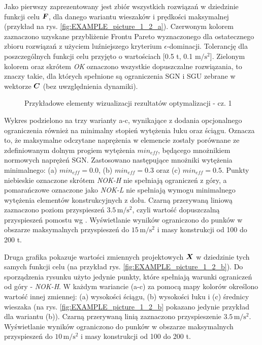 Jako pierwszy zaprezentowany jest zbiór wszystkich rozwiązań w dziedzinie funkcji celu $\bm{F}$, dla danego wariantu wieszaków i prędkości maksymalnej (przykład na rys. \ref{fig:EXAMPLE_picture_1_2_a}). Czerwonym kolorem zaznaczono uzyskane przybliżenie Frontu Pareto wyznaczonego dla ostatecznego zbioru rozwiązań z użyciem luźniejszego kryterium $\epsilon$-dominacji. Tolerancję dla poszczególnych funkcji celu przyjęto o wartościach [0.5 t, 0.1 $\mathrm{m/s^2}$]. Zielonym kolorem oraz skrótem \textit{OK} oznaczono wszystkie dopuszczalne rozwiązania, to znaczy takie, dla których spełnione są ograniczenia SGN i SGU zebrane w wektorze $\bm{C}$ (bez uwzględnienia dynamiki).  
\begin{figure}[b!]
	\centering
	\captionsetup{justification=centering}
	\caption{Przykładowe elementy wizualizacji rezultatów optymalizacji - cz. 1}
	\label{fig:EXAMPLE_picture_1_2}
\end{figure}
Wykres podzielono na trzy warianty a-c, wynikające z dodania opcjonalnego ograniczenia również na minimalny stopień wytężenia łuku oraz ściągu. Oznacza to, że maksymalne odczytane naprężenia w elemencie zostały porównane ze zdefiniowanym dolnym progiem wytężenia $min_{eff}$, będącego mnożnikiem normowych naprężeń SGN. Zastosowano następujące mnożniki wytężenia minimalnego: (a) $min_{eff}=0.0$, (b) $min_{eff}=0.3$ oraz (c) $min_{eff}=0.5$. Punkty niebieskie oznaczone skrótem \textit{NOK-H} nie spełniają ograniczeń z góry, a pomarańczowe oznaczone jako \textit{NOK-L} nie spełniają wymogu minimalnego wytężenia elementów konstrukcyjnych z dołu. Czarną przerywaną liniową zaznaczono poziom przyspieszeń $3.5\,\mathrm{m/s^2}$, czyli wartość dopuszczalną przyspieszeń pomostu wg \cite{PKNc}. Wyświetlanie wyników ograniczono do punków w obszarze maksymalnych przyspieszeń do  $15\,\mathrm{m/s^2}$ i masy konstrukcji od 100 do 200 t.



Druga grafika pokazuje wartości zmiennych projektowych $\bm{X}$ w dziedzinie tych samych funkcji celu (na przykład rys. \ref{fig:EXAMPLE_picture_1_2_b}). Do sporządzenia rysunku użyto jedynie punkty, które spełniają warunki ograniczeń od góry - \textit{NOK-H}. W każdym wariancie (a-c) za pomocą mapy kolorów określono wartość innej zmiennej: (a) wysokości ściągu, (b) wysokości łuku i (c) średnicy wieszaka (na rys. \ref{fig:EXAMPLE_picture_1_2_b} pokazano jedynie przykład dla wariantu (b)). Czarną przerywaną linią zaznaczono przyspieszenie $3.5\,\mathrm{m/s^2}$. Wyświetlanie wyników ograniczono do punków w obszarze maksymalnych przyspieszeń do $10\,\mathrm{m/s^2}$ i masy konstrukcji od 100 do 200 t.

